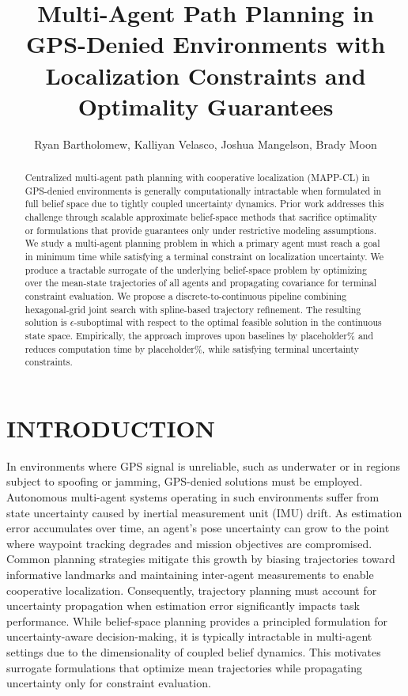 \documentclass[letterpaper, 10 pt, conference]{ieeeconf}  %
\title{\LARGE \bf
Multi-Agent Path Planning in GPS-Denied Environments with Localization Constraints and Optimality Guarantees
}
\author{Ryan Bartholomew, Kalliyan Velasco, Joshua Mangelson, Brady Moon}
\begin{document}
\maketitle
\thispagestyle{empty}
\pagestyle{empty}



\begin{abstract}

    Centralized multi-agent path planning with cooperative localization (MAPP-CL) in GPS-denied environments is generally computationally intractable when formulated in full belief space due to tightly coupled uncertainty dynamics. Prior work addresses this challenge through scalable approximate belief-space methods that sacrifice optimality or formulations that provide guarantees only under restrictive modeling assumptions. We study a multi-agent planning problem in which a primary agent must reach a goal in minimum time while satisfying a terminal constraint on localization uncertainty. We produce a tractable surrogate of the underlying belief-space problem by optimizing over the mean-state trajectories of all agents and propagating covariance for terminal constraint evaluation. We propose a discrete-to-continuous pipeline combining hexagonal-grid joint search with spline-based trajectory refinement. The resulting solution is $\epsilon$-suboptimal with respect to the optimal feasible solution in the continuous state space. Empirically, the approach improves upon baselines by placeholder\% and reduces computation time by placeholder\%, while satisfying terminal uncertainty constraints.
    
\end{abstract} %

\section{INTRODUCTION}  \label{sec:1_intro}

In environments where GPS signal is unreliable, such as underwater or in regions subject to spoofing or jamming, GPS-denied solutions must be employed. Autonomous multi-agent systems operating in such environments suffer from state uncertainty caused by inertial measurement unit (IMU) drift. As estimation error accumulates over time, an agent’s pose uncertainty can grow to the point where waypoint tracking degrades and mission objectives are compromised. Common planning strategies mitigate this growth by biasing trajectories toward informative landmarks and maintaining inter-agent measurements to enable cooperative localization. Consequently, trajectory planning must account for uncertainty propagation when estimation error significantly impacts task performance. While belief-space planning provides a principled formulation for uncertainty-aware decision-making, it is typically intractable in multi-agent settings due to the dimensionality of coupled belief dynamics. This motivates surrogate formulations that optimize mean trajectories while propagating uncertainty only for constraint evaluation.
\end{document}
